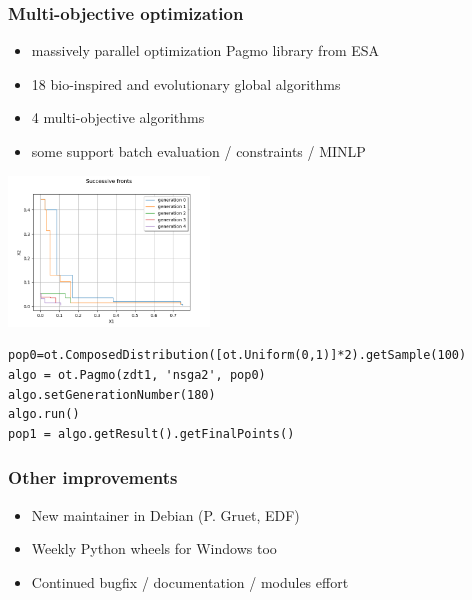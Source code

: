 \documentclass{beamer}
\begin{document}
\begin{frame}[containsverbatim]
\frametitle{Multi-objective optimization}

% 

\begin{itemize}
\item massively parallel optimization Pagmo library from ESA
\item 18 bio-inspired and evolutionary global algorithms
\item 4 multi-objective algorithms
\item some support batch evaluation / constraints / MINLP
\end{itemize}

\begin{center}
\includegraphics[width=0.4\textwidth]{figures/sphx_glr_plot_optimization_pagmo_002.png}
\end{center}

\begin{lstlisting}
pop0=ot.ComposedDistribution([ot.Uniform(0,1)]*2).getSample(100)
algo = ot.Pagmo(zdt1, 'nsga2', pop0)
algo.setGenerationNumber(180)
algo.run()
pop1 = algo.getResult().getFinalPoints()
\end{lstlisting}


\end{frame}


\begin{frame}
\frametitle{Other improvements}

\begin{itemize}
\item New maintainer in Debian (P. Gruet, EDF)
\item Weekly Python wheels for Windows too
\item Continued bugfix / documentation / modules effort
\end{itemize}

\end{frame}
\end{document}
